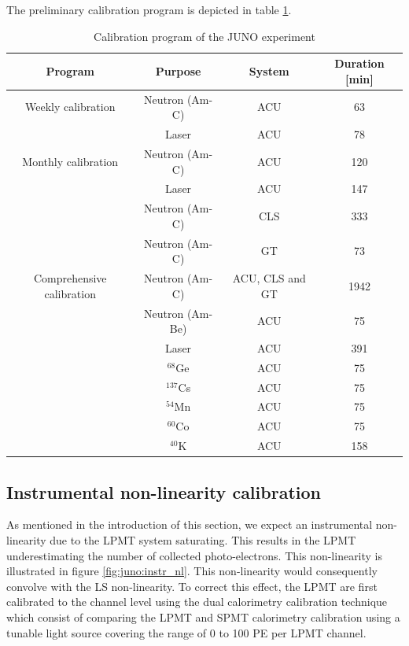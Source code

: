 \documentclass[../main.tex]{subfiles}
\begin{document}
The preliminary calibration program is depicted in table \ref{tab:juno:calib_prog}.

\begin{table}[ht]
  \centering
  \begin{tabular}{c c c c}
    \hline
    Program & Purpose & System & Duration [min] \\
    \hline
    Weekly calibration & Neutron (Am-C) & ACU & 63 \\
                       & Laser & ACU & 78  \\
                       \hline
    Monthly calibration & Neutron (Am-C) & ACU & 120 \\
                        & Laser  & ACU  & 147 \\
                        & Neutron (Am-C) & CLS & 333 \\
                        & Neutron (Am-C) & GT  & 73  \\
                        \hline
    Comprehensive calibration & Neutron (Am-C) & ACU, CLS and GT & 1942 \\
                              & Neutron (Am-Be) & ACU & 75 \\
                              & Laser & ACU & 391 \\
                              & $^{68}$Ge & ACU & 75 \\
                              & $^{137}$Cs & ACU & 75 \\
                              & $^{54}$Mn & ACU & 75 \\
                              & $^{60}$Co & ACU & 75 \\
                              & $^{40}$K & ACU & 158 \\
    \hline
  \end{tabular}
  \caption{Calibration program of the JUNO experiment}
  \label{tab:juno:calib_prog}
\end{table}

\subsection{Instrumental non-linearity calibration}

As mentioned in the introduction of this section, we expect an instrumental non-linearity due to the LPMT system saturating. This results in the LPMT underestimating the number of collected photo-electrons. This non-linearity is illustrated in figure \ref{fig:juno:instr_nl}. This non-linearity would consequently convolve with the LS non-linearity. To correct this effect, the LPMT are first calibrated to the channel level using the dual calorimetry calibration technique which consist of comparing the LPMT and SPMT calorimetry calibration using a tunable light source covering the range of 0 to 100 PE per LPMT channel.
\end{document}
